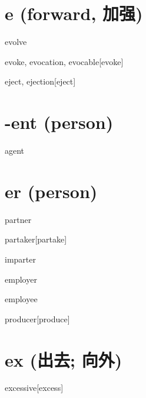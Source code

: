 \section{e (forward, 加强)}

\begin{RefWord}{evolve}
\end{RefWord}

\begin{RefWord}{evoke, evocation, evocable}[evoke]
\end{RefWord}

\begin{RefWord}{eject, ejection}[eject]
\end{RefWord}

\section{-ent (person)}

\begin{RefWord}{agent}
\end{RefWord}

\section{er (person)}

\begin{RefWord}{partner}
\end{RefWord}

\begin{RefWord}{partaker}[partake]
\end{RefWord}

\begin{RefWord}{imparter}
\end{RefWord}

\begin{RefWord}{employer}
\end{RefWord}

\begin{RefWord}{employee}
\end{RefWord}

\begin{RefWord}{producer}[produce]
\end{RefWord}

\section{ex (出去; 向外)}

\begin{RefWord}{excessive}[excess]
\end{RefWord}

